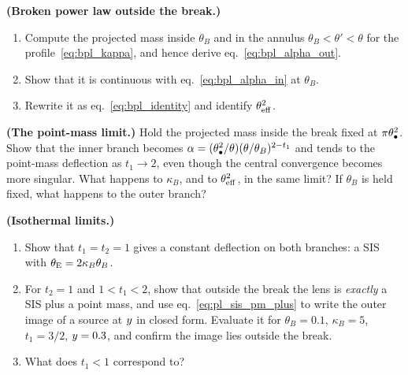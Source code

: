 \begin{exercise}
\label{ex:bpl_outside}
\textbf{(Broken power law outside the break.)}
\begin{enumerate}[label=(\alph*)]
  \item Compute the projected mass inside $\theta_B$ and in the annulus
        $\theta_B<\theta'<\theta$ for the profile~\eqref{eq:bpl_kappa},
        and hence derive eq.~\eqref{eq:bpl_alpha_out}.
  \item Show that it is continuous with eq.~\eqref{eq:bpl_alpha_in} at
        $\theta_B$.
  \item Rewrite it as eq.~\eqref{eq:bpl_identity} and identify
        $\theta_{\rm eff}^2$.
\end{enumerate}
\end{exercise}

\begin{exercise}
\label{ex:bpl_point_mass_limit}
\textbf{(The point-mass limit.)}
Hold the projected mass inside the break fixed at $\pi\theta_{\bullet}^2$.
Show that the inner branch becomes
$\alpha=(\theta_{\bullet}^2/\theta)(\theta/\theta_B)^{2-t_1}$ and tends to the
point-mass deflection as $t_1\to2$, even though the central convergence
becomes more singular.  What happens to $\kappa_B$, and to
$\theta_{\rm eff}^2$, in the same limit?  If $\theta_B$ is held fixed,
what happens to the outer branch?
\end{exercise}

\begin{exercise}
\label{ex:bpl_sis_limit}
\textbf{(Isothermal limits.)}
\begin{enumerate}[label=(\alph*)]
  \item Show that $t_1=t_2=1$ gives a constant deflection on both
        branches: a SIS with $\theta_{\mathrm{E}}=2\kappa_B\theta_B$.
  \item For $t_2=1$ and $1<t_1<2$, show that outside the break the
        lens is \emph{exactly} a SIS plus a point mass, and use
        eq.~\eqref{eq:pl_sis_pm_plus} to write the outer image of a
        source at $y$ in closed form.  Evaluate it for
        $\theta_B=0.1$, $\kappa_B=5$, $t_1=3/2$, $y=0.3$, and
        confirm the image lies outside the break.
  \item What does $t_1<1$ correspond to?
\end{enumerate}
\end{exercise}
